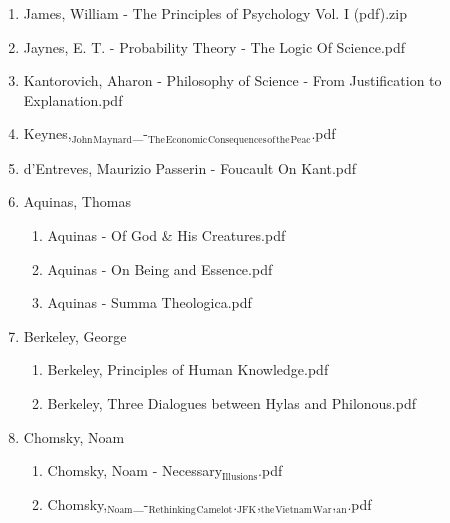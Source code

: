 \documentclass[11pt]{article}
\begin{document}
\begin{enumerate}
\begin{enumerate}
\begin{enumerate}
\begin{enumerate}
\begin{enumerate}
\item James, William - The Principles of Psychology Vol. I (pdf).zip
\label{sec-1-1-1-1-7-3-14-24}

\item Jaynes, E. T. - Probability Theory - The Logic Of Science.pdf
\label{sec-1-1-1-1-7-3-14-25}

\item Kantorovich, Aharon - Philosophy of Science - From Justification to Explanation.pdf
\label{sec-1-1-1-1-7-3-14-26}

\item Keynes,$_{\text{John}}$$_{\text{Maynard}}$\_-$_{\text{The}}$$_{\text{Economic}}$$_{\text{Consequences}}$$_{\text{of}}$$_{\text{the}}$$_{\text{Peac}}$.pdf
\label{sec-1-1-1-1-7-3-14-27}

\item d'Entreves, Maurizio Passerin - Foucault On Kant.pdf
\label{sec-1-1-1-1-7-3-14-28}

\item Aquinas, Thomas
\label{sec-1-1-1-1-7-3-14-29}
\begin{enumerate}
\item Aquinas - Of God \& His Creatures.pdf
\label{sec-1-1-1-1-7-3-14-29-1}

\item Aquinas - On Being and Essence.pdf
\label{sec-1-1-1-1-7-3-14-29-2}

\item Aquinas - Summa Theologica.pdf
\label{sec-1-1-1-1-7-3-14-29-3}
\end{enumerate}

\item Berkeley, George
\label{sec-1-1-1-1-7-3-14-30}
\begin{enumerate}
\item Berkeley, Principles of Human Knowledge.pdf
\label{sec-1-1-1-1-7-3-14-30-1}

\item Berkeley, Three Dialogues between Hylas and Philonous.pdf
\label{sec-1-1-1-1-7-3-14-30-2}
\end{enumerate}

\item Chomsky, Noam
\label{sec-1-1-1-1-7-3-14-31}
\begin{enumerate}
\item Chomsky, Noam - Necessary$_{\text{Illusions}}$.pdf
\label{sec-1-1-1-1-7-3-14-31-1}

\item Chomsky,$_{\text{Noam}}$\_-$_{\text{Rethinking}}$$_{\text{Camelot}}$.$_{\text{JFK}}$,$_{\text{the}}$$_{\text{Vietnam}}$$_{\text{War}}$,$_{\text{an}}$.pdf
\label{sec-1-1-1-1-7-3-14-31-2}


\end{enumerate}
\end{enumerate}
\end{enumerate}
\end{enumerate}
\end{enumerate}
\end{enumerate}
\end{document}
